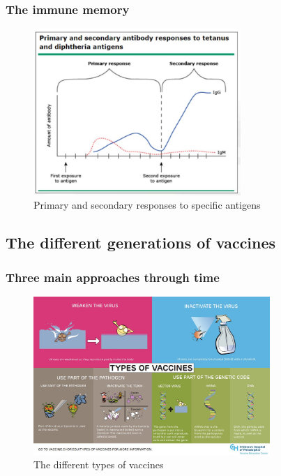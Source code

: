 \begin{frame}
    \frametitle{The immune memory}
\begin{figure}
    \centering
    \includegraphics[width=0.7\textwidth]{imgs/PrimarySecondaryResponses.JPG}
    \caption{Primary and secondary responses to specific antigens \autocite{pinkComparisonImmunityGeneral}}
    \label{fig:responses12}
\end{figure}
\end{frame}


\subsection{The different generations of vaccines}

\begin{frame}
    \frametitle{Three main approaches through time}
    \begin{figure}
        \centering
        \includegraphics[width=0.8\textwidth]{imgs/VaccineGeneration.JPG}
        \caption{The different types of vaccines \autocite{philadelphiaMakingVaccinesHow2014}}
        \label{fig:responses2}
    \end{figure}
\end{frame}

